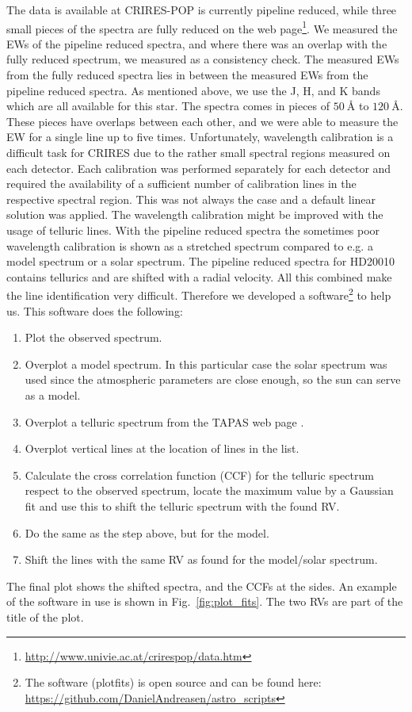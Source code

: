 \documentclass{aa}
\begin{document}
The data is available at CRIRES-POP is currently pipeline reduced, while
three small pieces of the spectra are fully reduced on
the web page\footnote{\url{http://www.univie.ac.at/crirespop/data.htm}}.
We measured the EWs of the pipeline reduced spectra, and where there
was an overlap with the fully reduced spectrum, we measured as a
consistency check. The measured EWs from the fully reduced spectra lies
in between the measured EWs from the pipeline reduced spectra. As mentioned above, we use the J, H,
and K bands which are all available for this star. The spectra comes
in pieces of $\SI{50}{\angstrom}$ to $\SI{120}{\angstrom}$. These
pieces have overlaps between each other, and we were able
to measure the EW for a single line up to five times. Unfortunately, wavelength
calibration is a difficult task for CRIRES due to the rather small
spectral regions measured on each detector. Each calibration was
performed separately for each detector and required the availability
of a sufficient number of calibration lines in the respective spectral
region. This was not always the case and a default linear solution
was applied. The wavelength calibration might be improved with the
usage of telluric lines. With the pipeline reduced spectra the
sometimes poor wavelength calibration is shown as a stretched spectrum
compared to e.g. a model spectrum or a solar spectrum. The pipeline
reduced spectra for HD20010 contains tellurics and are shifted with a
radial velocity. All this combined make the line identification very
difficult. Therefore we developed a software\footnote{The software
(plot\textunderscore{}fits) is open source and can be found here:
\url{https://github.com/DanielAndreasen/astro_scripts}} to help us. This
software does the following:
\begin{enumerate}
    \item Plot the observed spectrum.
    \item Overplot a model spectrum. In this particular case the solar spectrum was
        used since the atmospheric parameters are close enough, so the sun can
        serve as a model.
    \item Overplot a telluric spectrum from the TAPAS web page \citep{Bertaux2014}.
    \item Overplot vertical lines at the location of lines in the list.
    \item Calculate the cross correlation function (CCF) for the telluric spectrum
        respect to the observed spectrum, locate the maximum value by a Gaussian fit
        and use this to shift the telluric spectrum with the found RV.
    \item Do the same as the step above, but for the model.
    \item Shift the lines with the same RV as found for the model/solar spectrum.
\end{enumerate}
The final plot shows the shifted spectra, and the CCFs at the sides. An
example of the software in use is shown in Fig.~\ref{fig:plot_fits}. The
two RVs are part of the title of the plot.
\end{document}
